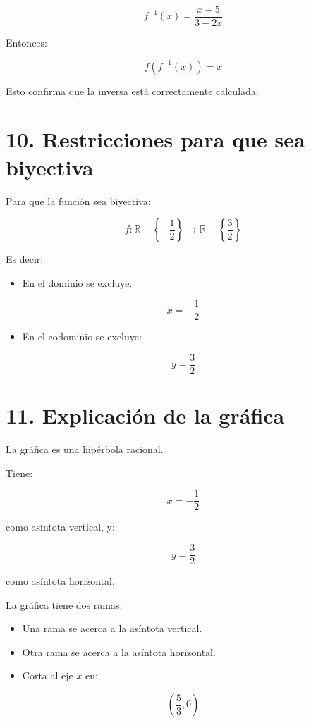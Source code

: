 \documentclass[12pt,a4paper]{article}
\begin{document}
	\[
	f^{-1}(x)=\frac{x+5}{3-2x}
	\]
	
	Entonces:
	
	\[
	f\left(f^{-1}(x)\right)=x
	\]
	
	Esto confirma que la inversa está correctamente calculada.
	
	\section*{10. Restricciones para que sea biyectiva}
	
	Para que la función sea biyectiva:
	
	\[
	f:\mathbb{R}-\left\{-\frac{1}{2}\right\}\rightarrow \mathbb{R}-\left\{\frac{3}{2}\right\}
	\]
	
	Es decir:
	
	\begin{itemize}
		\item En el dominio se excluye:
	\end{itemize}
	
	\[
	x=-\frac{1}{2}
	\]
	
	\begin{itemize}
		\item En el codominio se excluye:
	\end{itemize}
	
	\[
	y=\frac{3}{2}
	\]
	
	\section*{11. Explicación de la gráfica}
	
	La gráfica es una hipérbola racional.
	
	Tiene:
	
	\[
	x=-\frac{1}{2}
	\]
	
	como asíntota vertical, y:
	
	\[
	y=\frac{3}{2}
	\]
	
	como asíntota horizontal.
	
	La gráfica tiene dos ramas:
	
	\begin{itemize}
		\item Una rama se acerca a la asíntota vertical.
		\item Otra rama se acerca a la asíntota horizontal.
		\item Corta al eje $x$ en:
	\end{itemize}
	
	\[
	\left(\frac{5}{3},0\right)
	\]
	
\end{document}
